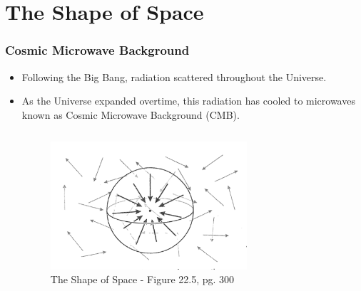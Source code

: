 \documentclass[13pt]{beamer}
\begin{document}
\section{The Shape of Space} %
\begin{frame}
\frametitle{Cosmic Microwave Background}
  \begin{itemize}
    \item Following the Big Bang, radiation scattered throughout the Universe.
    \item As the Universe expanded overtime, this radiation has cooled to microwaves known as \alert{Cosmic Microwave Background (CMB)}.

    \begin{columns}[c] %
     \centering
      \begin{figure}
        \includegraphics[height=4.75cm]{./img/scattering} %
        \caption{The Shape of Space - Figure 22.5, pg. 300}
      \end{figure}
  \end{columns}

  \end{itemize}
\end{frame}
\end{document}
